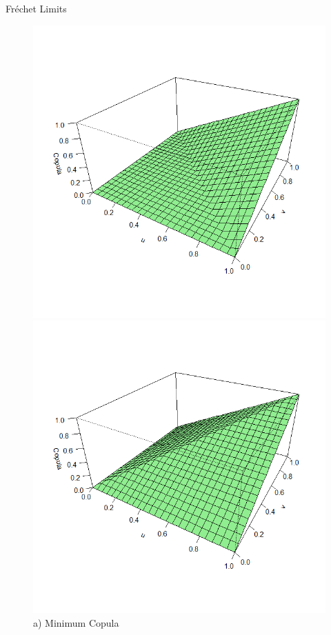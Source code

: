 \documentclass[11pt]{beamer}
\theoremstyle{plain}
\theoremstyle{definition}
\theoremstyle{remark}
\begin{document}
%
\begin{frame}{Fréchet Limits}
    \begin{figure}[ht]
        \begin{minipage}[b]{0.45\linewidth}
            \centering
            \includegraphics[width=\textwidth]{fig/copula_minima.png}
            \caption{a) Minimum Copula}
            \label{fig:a}
        \end{minipage}
        \hspace{0.5cm}
        \begin{minipage}[b]{0.45\linewidth}
            \centering
            \includegraphics[width=\textwidth]{fig/copula_massima.png}

\end{minipage}
\end{figure}
\end{frame}
\end{document}
